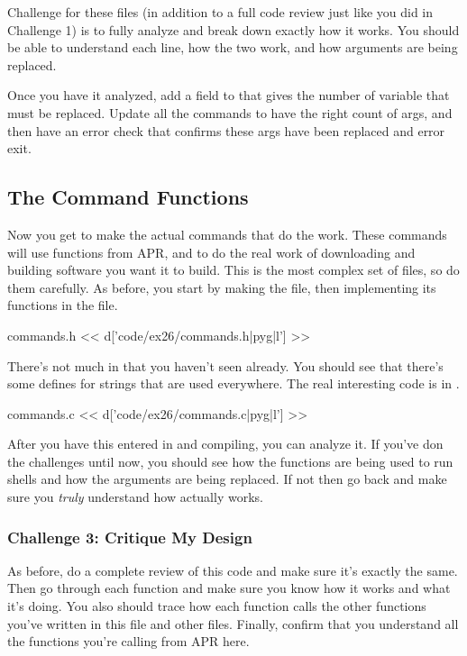 Challenge for these files (in addition to a full code review just like you
did in Challenge 1) is to fully analyze  and break down
exactly how it works.  You should be able to understand each line, how
the two  work, and how arguments are being replaced.

Once you have it analyzed, add a field to  that gives
the number of variable  that must be replaced.  Update all the
commands to have the right count of args, and then have an error check that
confirms these args have been replaced and error exit.

\subsection{The Command Functions}

Now you get to make the actual commands that do the work.  These commands
will use functions from APR,  and  to do the 
real work of downloading and building software you want it to build.
This is the most complex set of files, so do them carefully.  As before, you
start by making the  file, then implementing its functions
in the  file.

\begin{code}{commands.h}
<< d['code/ex26/commands.h|pyg|l'] >>
\end{code}

There's not much in  that you haven't seen already.  You
should see that there's some defines for strings that are used everywhere.
The real interesting code is in .

\begin{code}{commands.c}
<< d['code/ex26/commands.c|pyg|l'] >>
\end{code}

After you have this entered in and compiling, you can analyze it.  If you've
don the challenges until now, you should see how the  functions
are being used to run shells and how the arguments are being replaced.  If
not then go back and make sure you \emph{truly} understand how 
actually works.

\subsubsection{Challenge 3: Critique My Design}

As before, do a complete review of this code and make sure it's exactly
the same.  Then go through each function and make sure you know how it 
works and what it's doing.  You also should trace how each function calls
the other functions you've written in this file and other files.  Finally,
confirm that you understand all the functions you're calling from APR here.

